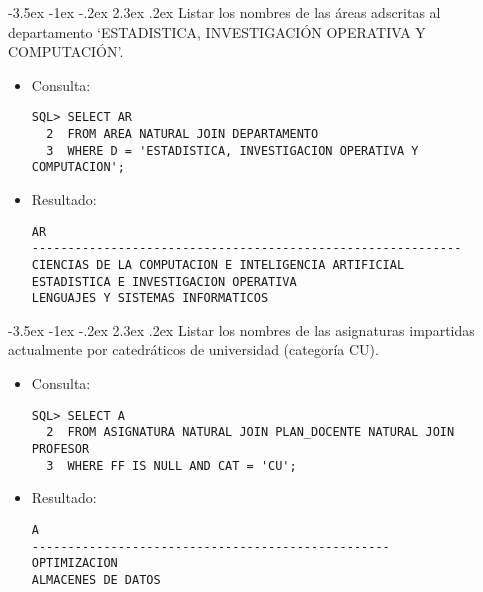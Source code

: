\documentclass[11pt]{report}
\makeatletter
\renewcommand\chapter{\@startsection{chapter}{0}{\z@}%
    {-3.5ex \@plus -1ex \@minus -.2ex}%
    {2.3ex \@plus.2ex}%
    {\normalfont\Large\bfseries}}
\makeatother
\begin{document}
\chapter{Listar los nombres de las áreas adscritas al departamento ‘ESTADISTICA, INVESTIGACIÓN OPERATIVA Y COMPUTACIÓN’.}
\begin{itemize}
  \item Consulta:
  \begin{verbatim}
SQL> SELECT AR
  2  FROM AREA NATURAL JOIN DEPARTAMENTO
  3  WHERE D = 'ESTADISTICA, INVESTIGACION OPERATIVA Y COMPUTACION';
  \end{verbatim}
  \item{Resultado:}
  \begin{verbatim}
AR                                                                              
------------------------------------------------------------                    
CIENCIAS DE LA COMPUTACION E INTELIGENCIA ARTIFICIAL                            
ESTADISTICA E INVESTIGACION OPERATIVA                                           
LENGUAJES Y SISTEMAS INFORMATICOS  
  \end{verbatim}
\end{itemize}

\chapter{Listar los nombres de las asignaturas impartidas actualmente por catedráticos de universidad (categoría CU).}
\begin{itemize}
  \item Consulta:
  \begin{verbatim}
SQL> SELECT A
  2  FROM ASIGNATURA NATURAL JOIN PLAN_DOCENTE NATURAL JOIN PROFESOR
  3  WHERE FF IS NULL AND CAT = 'CU';
  \end{verbatim}

\newpage

  \item{Resultado:}
  \begin{verbatim}
A                                                                               
--------------------------------------------------                              
OPTIMIZACION                                                                    
ALMACENES DE DATOS   
  \end{verbatim}
\end{itemize}

\end{document}
